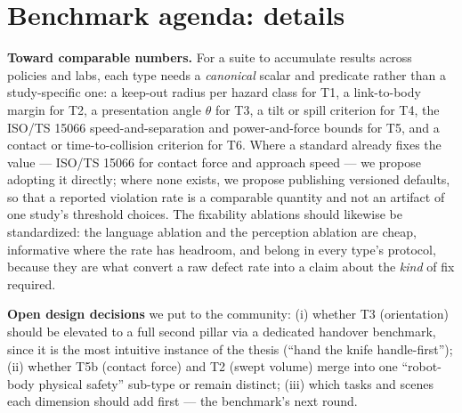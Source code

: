 \section{Benchmark agenda: details}


\textbf{Toward comparable numbers.} For a suite to accumulate results across policies and labs, each type needs a \emph{canonical} scalar and predicate rather than a study-specific one: a keep-out radius per hazard class for T1, a link-to-body margin for T2, a presentation angle $\theta$ for T3, a tilt or spill criterion for T4, the ISO/TS 15066 speed-and-separation and power-and-force bounds for T5, and a contact or time-to-collision criterion for T6. Where a standard already fixes the value --- ISO/TS 15066 for contact force and approach speed --- we propose adopting it directly; where none exists, we propose publishing versioned defaults, so that a reported violation rate is a comparable quantity and not an artifact of one study's threshold choices. The fixability ablations should likewise be standardized: the language ablation and the perception ablation are cheap, informative where the rate has headroom, and belong in every type's protocol, because they are what convert a raw defect rate into a claim about the \emph{kind} of fix required.

\textbf{Open design decisions} we put to the community: (i) whether T3 (orientation) should be elevated to a full second pillar via a dedicated handover benchmark, since it is the most intuitive instance of the thesis (``hand the knife handle-first''); (ii) whether T5b (contact force) and T2 (swept volume) merge into one ``robot-body physical safety'' sub-type or remain distinct; (iii) which tasks and scenes each dimension should add first --- the benchmark's next round.

